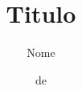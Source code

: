 \documentclass{pack}
\begin{document}
    \title{Titulo}
    \author{Nome}
    \date{\MONTH de \the\year}
    
    \maketitle
    
    
    
    
    
    
    
    
    \nocite{*}
    
    
    
    \newpage
    
    
    
    
\end{document}
